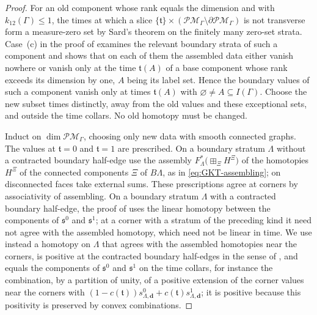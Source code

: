 \begin{proof}
For an old component whose rank equals the dimension and with
$k_{12}(\Gamma)\leq1$, the times at which a slice
$\{\mathfrak t\}\times(\mathcal{PM}_\Gamma\setminus\partial\mathcal{PM}_\Gamma)$
is not transverse form a measure-zero set
by Sard's theorem on the finitely many zero-set strata.  Case~(c) in the
proof of \cite[Lem.~3.40]{grossetal2022open} examines the relevant boundary
strata of such a component and shows that on each of them the assembled data
either vanish nowhere or vanish only at the time $\mathfrak t(A)$ of a base
component whose rank exceeds its dimension by one, $A$ being its label set.
Hence the boundary values of such a component vanish only at times
$\mathfrak t(A)$ with $\varnothing\neq A\subseteq I(\Gamma)$.  Choose the new
subset times distinctly, away from the old values and these exceptional
sets, and outside the time collars.  No old homotopy must be changed.

Induct on $\dim\mathcal{PM}_\Gamma$, choosing only new data with smooth
connected graphs.  The values at $\mathfrak t=0$ and $\mathfrak t=1$ are
prescribed.  On a boundary stratum $\Lambda$ without a contracted boundary
half-edge use the assembly $F_\Lambda^*\bigl(\boxplus_\Xi H^\Xi\bigr)$ of
the homotopies $H^\Xi$ of the connected components $\Xi$ of $B\Lambda$, as
in \eqref{eq:GKT-assembling}; on disconnected faces take external sums.
These prescriptions agree at corners by associativity of assembling.  On a
boundary stratum $\Lambda$ with a contracted boundary half-edge, the proof
of \cite[Lem.~3.40]{grossetal2022open} uses the linear homotopy between the
components of $\mathfrak s^0$ and $\mathfrak s^1$; at a corner with a
stratum of the preceding kind it need not agree with the assembled homotopy,
which need not be linear in time.  We use instead a homotopy on $\Lambda$
that agrees with the assembled homotopies near the corners, is positive at
the contracted boundary half-edges in the sense of
\cite[Def.~3.18(1)]{grossetal2022open}, and equals the components of
$\mathfrak s^0$ and $\mathfrak s^1$ on the time collars, for instance the
combination, by a partition of unity, of a positive extension of the corner
values near the corners with
$(1-c(\mathfrak t))s^0_{\Lambda,\mathbf d}+c(\mathfrak t)s^1_{\Lambda,\mathbf d}$;
it is positive because this positivity is preserved by convex
combinations.


\end{proof}
